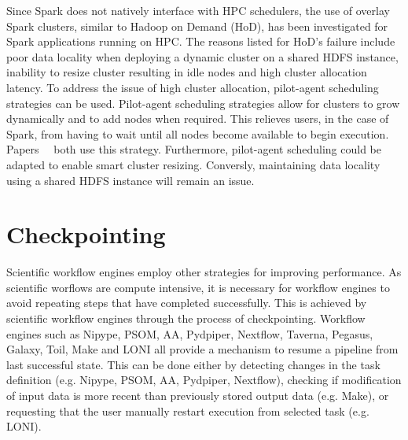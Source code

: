 \documentclass{report}
\begin{document}
            Since Spark does not natively interface with HPC schedulers, 
            the use of overlay Spark clusters, similar to Hadoop on Demand 
            (HoD), has been 
            investigated for Spark applications running on HPC. The reasons 
            listed for HoD's failure include poor 
            data locality when deploying a dynamic cluster on a shared HDFS 
            instance, inability to resize cluster resulting in idle nodes and 
            high cluster allocation latency. To address the issue of high 
            cluster allocation, pilot-agent scheduling strategies can be used.
            Pilot-agent scheduling strategies allow for clusters to grow 
            dynamically and to add nodes when required. This relieves users, 
            in the case of Spark, from having to wait until all nodes become 
            available to begin execution. 
            Papers~\cite{7530058}~\cite{Baer:2015:IAS:2792745.2792779} both use 
            this strategy. Furthermore, pilot-agent scheduling could be adapted
            to enable smart cluster resizing. Conversly, maintaining data 
            locality using a shared HDFS instance will remain an issue. 
         

        \section{Checkpointing}\label{other}                                    
                                                                                
            Scientific workflow engines employ other strategies for improving   
            performance. As scientific worflows are compute intensive, it is    
            necessary for workflow engines to avoid repeating steps that have   
            completed successfully. This is achieved by scientific workflow     
            engines through the process of checkpointing. Workflow engines such 
            as Nipype, PSOM, AA, Pydpiper, Nextflow, Taverna, Pegasus, Galaxy,  
            Toil, Make and LONI all provide a mechanism to resume a pipeline    
            from last successful state. This can be done either by detecting    
            changes in the task definition (e.g. Nipype, PSOM, AA, Pydpiper,    
            Nextflow), checking if modification of input                        
            data is more recent than previously stored output data (e.g. Make), 
            or requesting that the user manually restart execution from         
            selected task (e.g. LONI).                                          
                                                                                
\end{document}

